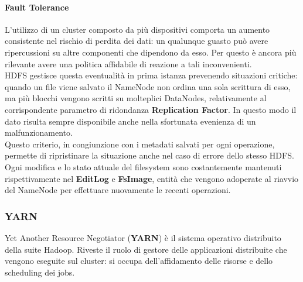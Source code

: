 \paragraph{Fault Tolerance}

L'utilizzo di un cluster composto da più dispositivi comporta un aumento consistente nel rischio di perdita dei dati: un qualunque guasto può avere ripercussioni su altre componenti che dipendono da esso. Per questo è ancora più rilevante avere una politica affidabile di reazione a tali inconvenienti.\\
HDFS gestisce questa eventualità in prima istanza prevenendo situazioni critiche: quando un file viene salvato il NameNode non ordina una sola scrittura di esso, ma più blocchi vengono scritti su molteplici DataNodes, relativamente al corrispondente parametro di ridondanza \textbf{Replication Factor}. In questo modo il dato risulta sempre disponibile anche nella sfortunata evenienza di un malfunzionamento.\\
Questo criterio, in congiunzione con i metadati salvati per ogni operazione, permette di ripristinare la situazione anche nel caso di errore dello stesso HDFS. Ogni modifica e lo stato attuale del filesystem sono costantemente mantenuti rispettivamente nel \textbf{EditLog} e \textbf{FsImage}, entità che vengono adoperate al riavvio del NameNode per effettuare nuovamente le recenti operazioni.

\subsubsection{YARN} 
Yet Another Resource Negotiator \cite{yarn_doc} (\textbf{YARN}) è il sistema operativo distribuito della suite Hadoop. Riveste il ruolo di gestore delle applicazioni distribuite che vengono eseguite sul cluster: si occupa dell'affidamento delle risorse e dello scheduling dei jobs.

